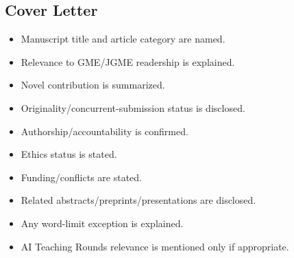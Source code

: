 \documentclass[12pt]{article}
\begin{document}
\subsection*{Cover Letter}

\begin{itemize}[label=$\square$, leftmargin=*]
	\item Manuscript title and article category are named.
	\item Relevance to GME/JGME readership is explained.
	\item Novel contribution is summarized.
	\item Originality/concurrent-submission status is disclosed.
	\item Authorship/accountability is confirmed.
	\item Ethics status is stated.
	\item Funding/conflicts are stated.
	\item Related abstracts/preprints/presentations are disclosed.
	\item Any word-limit exception is explained.
	\item AI Teaching Rounds relevance is mentioned only if appropriate.
\end{itemize}
\end{document}
